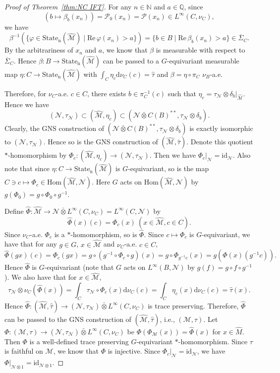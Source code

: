 \documentclass[12pt]{amsart}
\newcommand{\Q}{{\mathbb Q}}
\newcommand{\N}{{\mathbb N}}
\newcommand{\cM}{{\mathcal M}}
\newcommand{\cP}{{\mathcal P}}
\newcommand{\cN}{{\mathcal N}}
\def\d{\mathrm{d}}
\def\id {\mathrm{id}}
\theoremstyle{definition}
\begin{document}
\begin{proof}[Proof of Theorem~\ref{thm:NC IFT}]
For any $n\in\N$ and $a\in\Q$, since $$(b\mapsto\beta_b(x_n))=\cP_0(x_n)=\cP(x_n)\in L^\infty(C,\nu_C),$$
we have $$\beta^{-1}(\{\varphi\in\mathrm{State_n}(\hat{\cM})\mid \mathrm{Re}\,\varphi(x_n)>a\})=\{b\in B\mid \mathrm{Re}\,\beta_b(x_n)>a\}\in\overline{\Sigma}_C.$$
By the arbitrariness of $x_n$ and $a$, we know that $\beta$ is measurable with respect to $\overline{\Sigma}_C$. Hence $\beta: B\to \mathrm{State_n}(\hat{\cM})$ can be passed to a $G$-equivariant measurable map $\eta:C\to \mathrm{State_n}(\hat{\cM})$ with $\int_C\eta_c\d \nu_C(c)=\hat{\tau}$ and $\beta=\eta\circ\pi_C$ $\nu_B$-a.e.

Therefore, for $\nu_C$-a.e. $c\in C$, there exists $b\in\pi_C^{-1}(c)$ such that $\eta_c=\tau_\cN\otimes\delta_b|_{\hat{\cM}}$. Hence we have
$$(\cN,\tau_\cN)\subset(\hat{\cM},\eta_c)\subset(\cN\bar{\otimes} C(B)^{**},\tau_\cN\otimes\delta_b).$$
Clearly, the GNS construction of $(\cN\bar{\otimes} C(B)^{**},\tau_\cN\otimes\delta_b)$ is exactly isomorphic to $(\cN,\tau_\cN)$. Hence so is the GNS construction of $(\hat{\cM},\hat{\tau})$. Denote this quotient $\ast$-homomorphism by $\Phi_c:(\hat{\cM},\eta_c)\to (\cN,\tau_\cN)$. Then we have $\Phi_c|_\cN=\id_\cN$. Also note that since $\eta:C\to\mathrm{State_n}(\hat{\cM})$ is $G$-equivariant, so is the map $C\ni c\mapsto \Phi_c\in \mathrm{Hom}(\hat{\cM},\cN)$. Here $G$ acts on $\mathrm{Hom}(\hat{\cM},\cN)$ by $g(\Phi_0)=g\circ\Phi_0\circ g^{-1}$.

Define $\hat{\Phi}:\hat{\cM}\to \cN\bar{\otimes} L^\infty(C,\nu_C)=L^\infty(C,\cN)$ by
$$\hat{\Phi}(x)(c)=\Phi_c(x)\ (x\in\hat{\cM},c\in C).$$
Since $\nu_C$-a.e. $\Phi_c$ is a $\ast$-homomorphism, so is $\hat{\Phi}$. Since $c\mapsto\Phi_c$ is $G$-equivariant, we have that for any $g\in G$, $x\in \hat{\cM}$ and $\nu_C$-a.e. $c\in C$,
$$\hat{\Phi}(gx)(c)=\Phi_c(gx)=g \circ(g^{-1}\circ\Phi_c\circ g)(x)=g \circ\Phi_{g^{-1}c}(x)=g(\hat{\Phi}(x)(g^{-1}c)).$$ 
Hence $\hat{\Phi}$ is $G$-equivariant (note that $G$ acts on $L^\infty(B,\cN)$ by $g(f)=g\circ f\circ g^{-1}$). We also have that for $x\in\hat{\cM}$,
$$\tau_\cN\otimes\nu_C(\hat{\Phi}(x))=\int_C \tau_\cN\circ\Phi_c(x)\d\nu_C(c)=\int_C \eta_c(x)\d\nu_C(c)=\hat{\tau}(x).$$
Hence $\hat{\Phi}:(\hat{\cM},\hat{\tau})\to(\cN,\tau_\cN)\bar{\otimes} L^\infty(C,\nu_C)$ is trace preserving. Therefore, $\hat{\Phi}$ can be passed to the GNS construction of $(\hat{\cM},\hat{\tau})$, i.e., $(\cM,\tau)$. Let $\Phi:(\cM, \tau)\to(\cN,\tau_\cN)\bar{\otimes} L^\infty(C,\nu_C)$ be $\Phi(\Phi_\cM(x))=\hat{\Phi}(x)$ for $x\in\hat{M}$. Then $\Phi$ is a well-defined trace preserving $G$-equivariant $\ast$-homomorphism. Since $\tau$ is faithful on $\cM$, we know that $\Phi$ is injective. Since $\Phi_c|_\cN=\id_\cN$, we have $\Phi|_{\cN\otimes1}=\id_{\cN\otimes 1}$. 


\end{proof}
\end{document}
